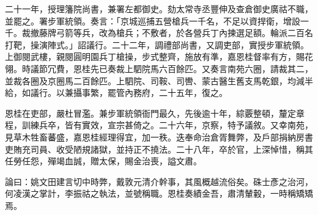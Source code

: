 \begin{pinyinscope}
二十一年，授理籓院尚書，兼署左都御史。劾太常寺丞豐伸及查倉御史廣祜不職，並罷之。署步軍統領。奏言：「京城巡捕五營槍兵一千名，不足以資捍衛，增設一千。裁撤藤牌弓箭等兵，改為槍兵；不敷者，於各營兵丁內揀選足額。輪派二百名打靶，操演陣式。」詔議行。二十二年，調禮部尚書，又調吏部，實授步軍統領。上御閱武樓，親閱圓明園兵丁槍操，步式整齊，施放有準，嘉恩桂督率有方，賜花翎。時議節冗費，恩桂先已奏裁上駟院馬六百餘匹。又奏言南苑六圈，請裁其二，並裁各圈及京圈馬二百餘匹。上駟院、司鞍、司轡、蒙古醫生舊支馬乾銀，均減半給，如議行。以兼攝事繁，罷管內務府，二十五年，復之。

恩桂在吏部，嚴杜冒濫。兼步軍統領衙門最久，先後逾十年，綜覈整頓，釐定章程，訓練兵卒，皆有實效，宣宗甚倚之。二十六年，京察，特予議敘。又幸南苑，見草木牲畜蕃盛，嘉恩桂經理得宜，加一秩。迭奉命治倉胥舞弊，及戶部捐納房書吏賄充司員、收受陋規諸獄，並持正不撓法。二十八年，卒於官，上深悼惜，稱其任勞任怨，殫竭血誠，贈太保，賜金治喪，謚文肅。

論曰：姚文田建言切中時弊，戴敦元清介幹事，其風概越流俗矣。硃士彥之治河，何凌漢之掌計，李振祜之執法，並號稱職。恩桂奏績金吾，肅清輦轂，一時稱矯矯焉。


\end{pinyinscope}